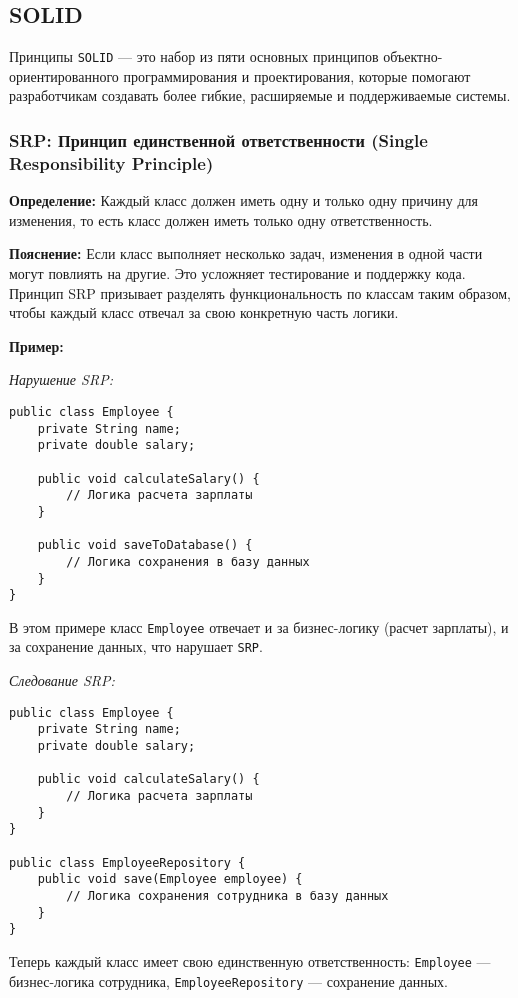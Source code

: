 \subsection{SOLID}

Принципы \texttt{SOLID} --- это набор из пяти основных принципов объектно-ориентированного программирования и проектирования, которые помогают разработчикам создавать более гибкие, расширяемые и поддерживаемые системы.


\subsubsection{SRP: Принцип единственной ответственности (Single Responsibility Principle)}

\textbf{Определение:}
Каждый класс должен иметь одну и только одну причину для изменения, то есть класс должен иметь только одну ответственность.

\textbf{Пояснение:}
Если класс выполняет несколько задач, изменения в одной части могут повлиять на другие. Это усложняет тестирование и поддержку кода. Принцип SRP призывает разделять функциональность по классам таким образом, чтобы каждый класс отвечал за свою конкретную часть логики.

\textbf{Пример:}

\textit{Нарушение SRP:}
\begin{verbatim}
public class Employee {
    private String name;
    private double salary;

    public void calculateSalary() {
        // Логика расчета зарплаты
    }

    public void saveToDatabase() {
        // Логика сохранения в базу данных
    }
}
\end{verbatim}

В этом примере класс \texttt{Employee} отвечает и за бизнес-логику (расчет зарплаты), и за сохранение данных, что нарушает \texttt{SRP}.

\textit{Следование SRP:}
\begin{verbatim}
public class Employee {
    private String name;
    private double salary;

    public void calculateSalary() {
        // Логика расчета зарплаты
    }
}

public class EmployeeRepository {
    public void save(Employee employee) {
        // Логика сохранения сотрудника в базу данных
    }
}
\end{verbatim}

Теперь каждый класс имеет свою единственную ответственность: \texttt{Employee} --- бизнес-логика сотрудника, \texttt{EmployeeRepository} --- сохранение данных.

